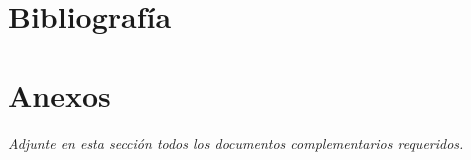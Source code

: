 \documentclass[12pt,a4paper]{article}
\begin{document}
\section{Bibliografía}



\section{Anexos}
\noindent
\textit{Adjunte en esta sección todos los documentos complementarios requeridos.}
\end{document}
